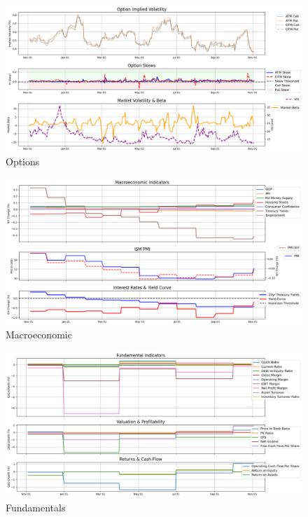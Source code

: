 \documentclass[8pt]{scrartcl}
\begin{document}
\begin{figure}[H]
    \centering
    \includegraphics[width=1\linewidth]{judge_reviews/TSLA_M_gpt-4o-mini/2019-11-04/judge_Option_Implied_Volatility.png}
    \caption{Options}
\end{figure}

\begin{figure}[H]
    \centering
    \includegraphics[width=1\linewidth]{judge_reviews/TSLA_M_gpt-4o-mini/2019-11-04/judge_Macroeconomic_Indicators.png}
    \caption{Macroeconomic}
\end{figure}

\begin{figure}[H]
    \centering
    \includegraphics[width=1\linewidth]{judge_reviews/TSLA_M_gpt-4o-mini/2019-11-04/judge_Fundamental_Indicators.png}
    \caption{Fundamentals}
\end{figure}
\end{document}
